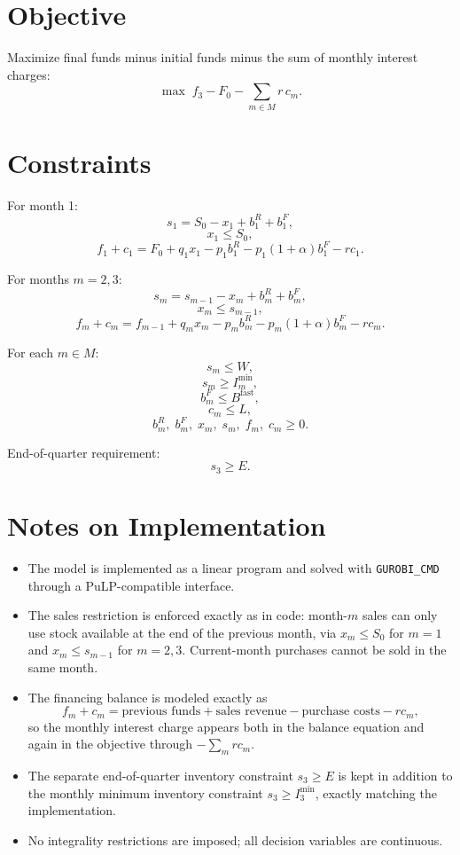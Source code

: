 \section*{Objective}

Maximize final funds minus initial funds minus the sum of monthly interest charges:
\[
\max \; f_3 - F_0 - \sum_{m\in M} r\,c_m .
\]

\section*{Constraints}

For month 1:
\[
s_1 = S_0 - x_1 + b^R_1 + b^F_1,
\]
\[
x_1 \le S_0,
\]
\[
f_1 + c_1 = F_0 + q_1 x_1 - p_1 b^R_1 - p_1(1+\alpha)b^F_1 - r c_1.
\]

For months $m=2,3$:
\[
s_m = s_{m-1} - x_m + b^R_m + b^F_m,
\]
\[
x_m \le s_{m-1},
\]
\[
f_m + c_m = f_{m-1} + q_m x_m - p_m b^R_m - p_m(1+\alpha)b^F_m - r c_m.
\]

For each $m\in M$:
\[
s_m \le W,
\]
\[
s_m \ge I^{\min}_m,
\]
\[
b^F_m \le B^{\text{fast}},
\]
\[
c_m \le L,
\]
\[
b^R_m,\; b^F_m,\; x_m,\; s_m,\; f_m,\; c_m \ge 0.
\]

End-of-quarter requirement:
\[
s_3 \ge E.
\]

\section*{Notes on Implementation}

\begin{itemize}
    \item The model is implemented as a linear program and solved with \texttt{GUROBI\_CMD} through a PuLP-compatible interface.
    \item The sales restriction is enforced exactly as in code: month-$m$ sales can only use stock available at the end of the previous month, via $x_m \le S_0$ for $m=1$ and $x_m \le s_{m-1}$ for $m=2,3$. Current-month purchases cannot be sold in the same month.
    \item The financing balance is modeled exactly as
    \[
    f_m + c_m = \text{previous funds} + \text{sales revenue} - \text{purchase costs} - r c_m,
    \]
    so the monthly interest charge appears both in the balance equation and again in the objective through $-\sum_m r c_m$.
    \item The separate end-of-quarter inventory constraint $s_3 \ge E$ is kept in addition to the monthly minimum inventory constraint $s_3 \ge I^{\min}_3$, exactly matching the implementation.
    \item No integrality restrictions are imposed; all decision variables are continuous.
\end{itemize}
